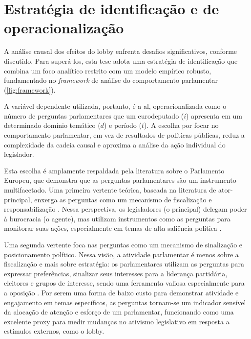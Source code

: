 \section{Estratégia de identificação e de operacionalização}
\label{section:identificacao}

A análise causal dos efeitos do lobby enfrenta desafios significativos, conforme discutido. Para superá-los, esta tese adota uma estratégia de identificação que combina um foco analítico restrito com um modelo empírico robusto, fundamentado no \textit{framework} de análise do comportamento parlamentar (\ref{fig:framework}).

A variável dependente utilizada, portanto, é a \acrfull{al}, operacionalizada como o número de perguntas parlamentares que um eurodeputado ($i$) apresenta em um determinado domínio temático ($d$) e período ($t$). A escolha por focar no comportamento parlamentar, em vez de resultados de políticas públicas, reduz a complexidade da cadeia causal e aproxima a análise da ação individual do legislador.

Esta escolha é amplamente respaldada pela literatura sobre o Parlamento Europeu, que demonstra que as perguntas parlamentares são um instrumento multifacetado. Uma primeira vertente teórica, baseada na literatura de ator-principal, enxerga as perguntas como um mecanismo de fiscalização e responsabilização \cite{jensen2013parliamentary, maricut2020qa, martin2013parliamentary}. Nessa perspectiva, os legisladores (o principal) delegam poder à burocracia (o agente), mas utilizam instrumentos como as perguntas para monitorar suas ações, especialmente em temas de alta saliência política \cite{mccubbin1984congressional, saalfeld2000members, strom2000delegation, koop2011explaining}. 

Uma segunda vertente foca nas perguntas como um mecanismo de sinalização e posicionamento político. Nessa visão, a atividade parlamentar é menos sobre a fiscalização e mais sobre estratégia: os parlamentares utilizam as perguntas para expressar preferências, sinalizar seus interesses para a liderança partidária, eleitores e grupos de interesse, sendo uma ferramenta valiosa especialmente para a oposição \cite{martin2013parliamentary, otjes2017parliamentary, proksch2010parliamentary, bevan2023do, navarro2022banking}. Por serem uma forma de baixo custo para demonstrar atividade e engajamento em temas específicos, as perguntas tornam-se um indicador sensível da alocação de atenção e esforço de um parlamentar, funcionando como uma excelente proxy para medir mudanças no ativismo legislativo em resposta a estímulos externos, como o lobby.

